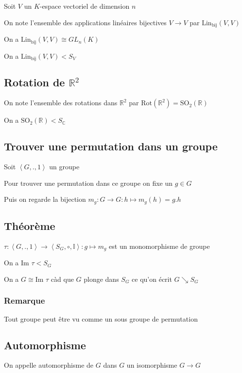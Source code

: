 \documentclass[a4paper,10pt]{article}
\newcommand{\im}{\mbox{Im }}
\newcommand{\grp}[1]{\left\langle #1 \right\rangle}
\newcommand{\ap}{\rightarrow}
\newcommand{\C}{\mathbb{C}}
\newcommand{\I}{\mathbb{I}}
\newcommand{\R}{\mathbb{R}}
\begin{document}
Soit $V$ un $K$-espace vectoriel de dimension $n$

On note l'ensemble des applications linéaires bijectives $V \ap V$ par ${\mbox{Lin}}_{\mbox{bij}} (V,V)$
 
On a ${\mbox{Lin}}_{\mbox{bij}} (V,V) \cong {GL}_n (K)$

On a ${\mbox{Lin}}_{\mbox{bij}} (V,V) < S_V$

\subsection{Rotation de $\R^2$}

On note l'ensemble des rotations dans $\R^2$ par $\mbox{Rot}(\R^2) = {\mbox{SO}}_2(\R)$

On a ${\mbox{SO}}_2(\R) < S_{\C}$

\subsection{Trouver une permutation dans un groupe}

Soit $\grp{G,.,1}$ un groupe

Pour trouver une permutation dans ce groupe on fixe un $g \in G$

Puis on regarde la bijection $m_g : G \ap G : h \mapsto m_g(h) = g.h$

\subsection{Théorème}

$\tau : \grp{G,.,1} \ap \grp{S_G, \circ, \I} : g \mapsto m_g$ est un monomorphisme de groupe

On a $\im \tau < S_G$ 

On a $G \cong \im \tau$ càd que $G$ plonge dans $S_G$ ce qu'on écrit $G \searrow S_G$

\subsubsection{Remarque}

Tout groupe peut être vu comme un sous groupe de permutation

\subsection{Automorphisme}

On appelle automorphisme de $G$ dans $G$ un isomorphisme $G \ap G$
\end{document}
